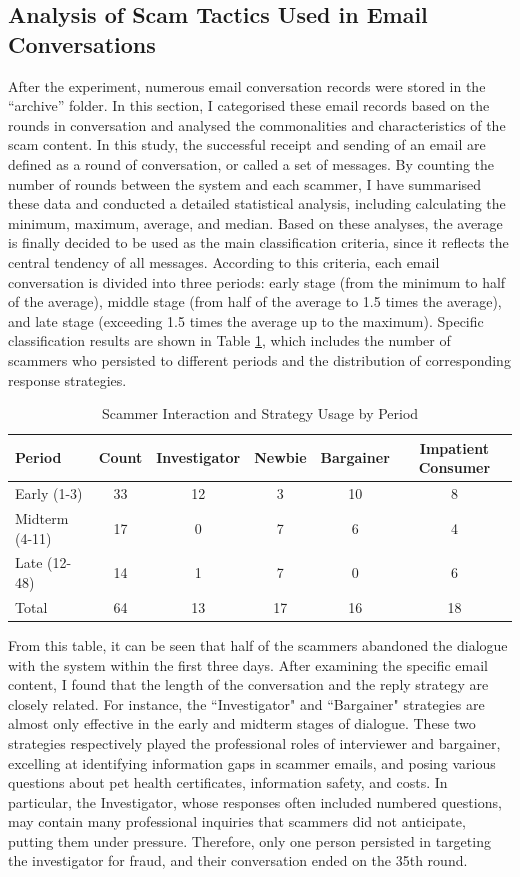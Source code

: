 \documentclass[ oneside,%
                    author={Cassie Qing Tang},
                    degree={BSc},
                     title={An Automated Response System for Disrupting Online Pet Scamming \\ },
                    subtitle={ }]{dissertation}
\begin{document}
\subsection{Analysis of Scam Tactics Used in Email Conversations}
\label{sec:4.2.2}
After the experiment, numerous email conversation records were stored in the “archive” folder. In this section, I categorised these email records based on the rounds in conversation and analysed the commonalities and characteristics of the scam content. In this study, the successful receipt and sending of an email are defined as a round of conversation, or called a set of messages. By counting the number of rounds between the system and each scammer, I have summarised these data and conducted a detailed statistical analysis, including calculating the minimum, maximum, average, and median. Based on these analyses, the average is finally decided to be used as the main classification criteria, since it reflects the central tendency of all messages. According to this criteria, each email conversation is divided into three periods: early stage (from the minimum to half of the average), middle stage (from half of the average to 1.5 times the average), and late stage (exceeding 1.5 times the average up to the maximum). Specific classification results are shown in Table \ref{tab:table4}, which includes the number of scammers who persisted to different periods and the distribution of corresponding response strategies.
\begin{table}[H]
\centering
\begin{tabular}{@{}lccccc@{}} 
\toprule
Period & Count & Investigator & Newbie & Bargainer & Impatient Consumer \\ 
\midrule
Early (1-3) & 33 & 12 & 3 & 10 & 8 \\
Midterm (4-11) & 17 & 0 & 7 & 6 & 4 \\
Late (12-48) & 14 & 1 & 7 & 0 & 6 \\
Total  & 64 & 13 & 17 & 16 & 18 \\
\bottomrule
\end{tabular}
\caption{Scammer Interaction and Strategy Usage by Period}
\label{tab:table4}
\end{table}

From this table, it can be seen that half of the scammers abandoned the dialogue with the system within the first three days. After examining the specific email content, I found that the length of the conversation and the reply strategy are closely related. For instance, the ``Investigator" and ``Bargainer" strategies are almost only effective in the early and midterm stages of dialogue. These two strategies respectively played the professional roles of interviewer and bargainer, excelling at identifying information gaps in scammer emails, and posing various questions about pet health certificates, information safety, and costs. In particular, the Investigator, whose responses often included numbered questions, may contain many professional inquiries that scammers did not anticipate, putting them under pressure. Therefore, only one person persisted in targeting the investigator for fraud, and their conversation ended on the 35th round.
\\
\end{document}
